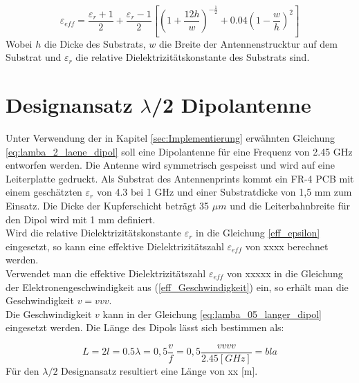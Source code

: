 \begin{equation}\label{eff_epsilon}
\varepsilon_{eff}=\dfrac{\varepsilon_r+1}{2}+\dfrac{\varepsilon_r-1}{2}\left[\left(1+\dfrac{12h}{w}\right)^{-\frac{1}{2}}+0.04\left(1-\dfrac{w}{h}\right)^{2}\right]
\end{equation}
Wobei $h$ die Dicke des Substrats, $w$ die Breite der Antennenstrucktur auf dem Substrat und  $\varepsilon_{r}$ die relative Dielektrizitätskonstante des Substrats sind. 

\section{Designansatz $\lambda$/2 Dipolantenne}  
Unter Verwendung der in Kapitel \ref{sec:Implementierung} erwähnten Gleichung \ref{eq:lamba_2_laene_dipol} soll eine Dipolantenne für eine Frequenz von 2.45 GHz entworfen werden. Die Antenne wird symmetrisch gespeisst und wird auf eine Leiterplatte gedruckt. Als Substrat des Antennenprints kommt ein  FR-4 PCB mit einem geschätzten  $\varepsilon_r $ von 4.3 bei 1 GHz und einer Substratdicke von 1,5 mm  zum Einsatz. Die Dicke der Kupferschicht beträgt 35 $\mu m$ und  die Leiterbahnbreite für den Dipol wird mit 1 mm definiert.\\

Wird die relative Dielektrizitätskonstante $\varepsilon_{r}$ in die Gleichung \ref{eff_epsilon} eingesetzt, so kann eine effektive Dielektrizitätszahl $\varepsilon_{eff}$  von xxxx berechnet werden.\\

Verwendet man die effektive Dielektrizitätszahl $\varepsilon_{eff}$ von xxxxx  in die Gleichung der Elektronengeschwindigkeit aus  (\ref{eff_Geschwindigkeit}) ein, so erhält man die Geschwindigkeit $v=vvv$. \\
Die Geschwindigkeit $v$  kann in der  Gleichung \ref{eq:lamba_05_langer_dipol} eingesetzt werden. Die Länge des Dipols lässt sich bestimmen als:

\begin{equation}\label{eq:lamba_05_langer_dipol}
L=2l = 0.5 \lambda= 0,5\dfrac{v}{f}=0,5 \dfrac{vvvv}{2.45[GHz]}=bla
\end{equation} 
Für den $\lambda/2$ Designansatz resultiert eine Länge von xx [m].
